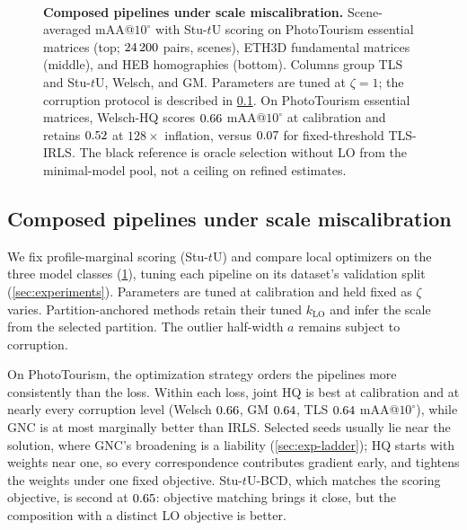 \documentclass[runningheads]{llncs}
\newcommand{\stuU}{Stu-$t$U}          %
\newcommand{\klo}{k_{\mathrm{LO}}}
\begin{document}
\begin{figure}[t!]
	\centering
	\\[3pt]
	\caption{\textbf{Composed pipelines under scale miscalibration.}
		Scene-averaged mAA@$10^\circ$ with \stuU{} scoring on PhotoTourism
		essential matrices (top; $24\,200$ pairs, \PTTestScenes{} scenes), ETH3D fundamental
		matrices (middle), and HEB homographies (bottom). Columns group TLS and
		\stuU{}, Welsch, and GM. Parameters are tuned at $\zeta=1$; the
		corruption protocol is described in \cref{sec:exp-miscal-lo}.
		On PhotoTourism essential matrices, Welsch-HQ scores $0.66$ mAA@$10^\circ$
		at calibration and retains $0.52$ at $128\times$ inflation, versus $0.07$
		for fixed-threshold TLS-IRLS. The black reference is oracle selection
		without LO from the minimal-model pool, not a ceiling on refined estimates.}
	\label{fig:miscal}
\end{figure}

\subsection{Composed pipelines under scale miscalibration}
\label{sec:exp-miscal-lo}
We fix profile-marginal scoring (\stuU{}) and compare local optimizers
on the three model classes (\cref{fig:miscal}), tuning each pipeline on
its dataset's validation split (\cref{sec:experiments}). Parameters are
tuned at calibration and held fixed as $\zeta$ varies.
Partition-anchored
methods retain their tuned $\klo$ and infer the scale from the selected
partition. The outlier half-width $a$ remains subject to corruption.

On PhotoTourism, the optimization strategy orders the pipelines more
consistently than the loss. Within each loss, joint HQ is best at
calibration and at nearly every corruption level (Welsch $0.66$, GM
$0.64$, TLS $0.64$ mAA@$10^\circ$), while GNC is at most marginally better
than IRLS. Selected seeds usually lie near the solution, where GNC's broadening
is a liability (\cref{sec:exp-ladder}); HQ starts with
weights near one, so every correspondence contributes gradient early, and
tightens the weights under one fixed objective. \stuU{}-BCD, which matches
the scoring objective, is second at $0.65$: objective matching brings it
close, but the composition with a distinct LO objective is better.
\end{document}
